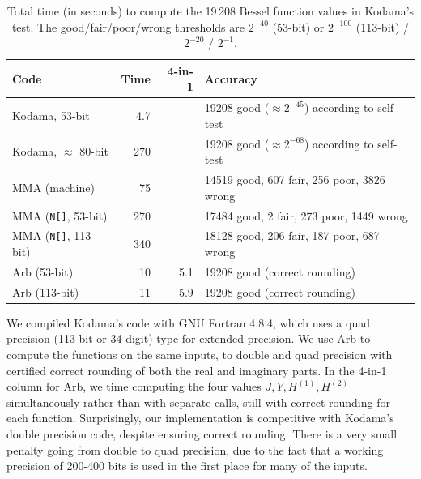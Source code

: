 \documentclass[review,nohypdvips]{siamart0216}
\begin{document}
\begin{table}
\renewcommand{\arraystretch}{1.1}
\setlength{\tabcolsep}{.4em}
\begin{center}
\caption{Total time (in seconds) to compute the 19\,208 Bessel function values in Kodama's test.
The good/fair/poor/wrong thresholds are $2^{-40}$ (53-bit) or $2^{-100}$ (113-bit) / $2^{-20}$ / $2^{-1}$.}
\begin{small}
\begin{tabular}{l | r r | l}
Code               & Time  & 4-in-1 &  Accuracy  \\ \hline
Kodama, 53-bit     & 4.7  &   &  19208 good ($\approx 2^{-45}$) according to self-test          \\
Kodama, $\approx$ 80-bit   & 270  &   &  19208 good ($\approx 2^{-68}$) according to self-test          \\ \hline
MMA (machine)            & 75  &   &  14519 good, 607 fair, 256 poor, 3826 wrong \\
MMA (\texttt{N[]}, 53-bit)           & 270   &  &  17484 good, 2 fair,   273 poor, 1449 wrong \\
MMA (\texttt{N[]}, 113-bit)           & 340  &   &  18128 good, 206 fair, 187 poor, 687 wrong \\ \hline
Arb (53-bit)       & 10  & 5.1  &  19208 good (correct rounding) \\
Arb (113-bit)      & 11  & 5.9  &  19208 good (correct rounding) \\
\end{tabular}
\end{small}
\label{tab:kodama}
\end{center}
\end{table}

We compiled Kodama's code with GNU Fortran 4.8.4, which uses a quad precision
(113-bit or 34-digit) type for extended precision.
We use Arb to compute the functions on the same
inputs, to double and quad precision
with certified correct rounding of both the real and imaginary parts.
In the 4-in-1 column for Arb, we time
computing the four values $J, Y, H^{(1)}, H^{(2)}$ simultaneously rather than with
separate calls, still with correct rounding for each function.
Surprisingly, our implementation is competitive with Kodama's double
precision code,
despite ensuring correct rounding.
There is a very small penalty going from double to quad precision,
due to the fact that a working precision of 200-400 bits is used
in the first place for many of the inputs.
\end{document}
